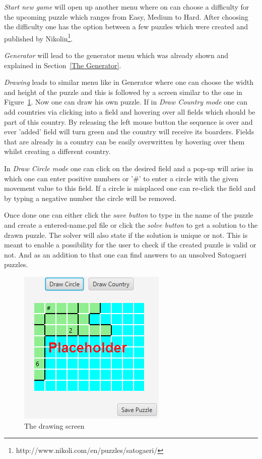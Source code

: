 \emph{Start new game} will open up another menu where on can choose a difficulty for the upcoming puzzle which ranges from Easy, Medium to Hard. After choosing the difficulty one has the option between a few puzzles which were created and published by Nikolin\footnote{http://www.nikoli.com/en/puzzles/satogaeri/}.

\emph{Generator} will lead to the generator menu which was already shown and explained in Section~\ref{The Generator}.

\emph{Drawing} leads to similar menu like in Generator where one can choose the width and height of the puzzle and this is followed by a screen similar to the one in Figure~\ref{fig:drawing_screen}.
Now one can draw his own puzzle. If in \emph{Draw Country mode} one can add countries via clicking into a field and hovering over all fields which should be part of this country. By releasing the left mouse button the sequence is over and ever 'added' field will turn green and the country will receive its boarders. Fields that are already in a country can be easily overwritten by hovering over them whilst creating a different country.

In \emph{Draw Circle mode} one can click on the desired field and a pop-up will arise in which one can enter positive numbers or '\#' to enter a circle with the given movement value to this field. If a circle is misplaced one can re-click the field and by typing a negative number the circle will be removed.

Once done one can either click the \emph{save button} to type in the name of the puzzle and create a entered-name.pzl file or click the \emph{solve button} to get a solution to the drawn puzzle. The solver will also state if the solution is unique or not. This is meant to enable a possibility for the user to check if the created puzzle is valid or not. And as an addition to that one can find answers to an unsolved Satogaeri puzzles.
\begin{figure}
  \centering
  \includegraphics[scale=1]{Pictures/drawing_screen.png} 
  \caption{The drawing screen}
  \label{fig:drawing_screen}
\end{figure}

